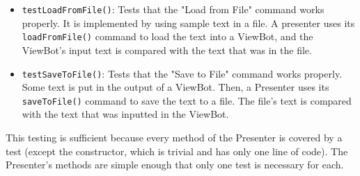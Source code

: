 \documentclass[11pt]{article}
\begin{document}
\begin{itemize}
\item \texttt{testLoadFromFile()}: Tests that the "Load from File" command works properly.  
It is implemented by using sample text in a file.  A presenter uses its \texttt{loadFromFile()} command to load the text into a ViewBot, and the ViewBot's input text is compared with the text that was in the file.
\item \texttt{testSaveToFile()}: Tests that the "Save to File" command works properly.
Some text is put in the output of a ViewBot.  Then, a Presenter uses its \texttt{saveToFile()} command to save the text to a file.  The file's text is compared with the text that was inputted in the ViewBot.
\end{itemize}

This testing is sufficient because every method of the Presenter is covered by a test (except the constructor, which is trivial and has only one line of code).  The Presenter's methods are simple enough that only one test is necessary for each.
\end{document}
